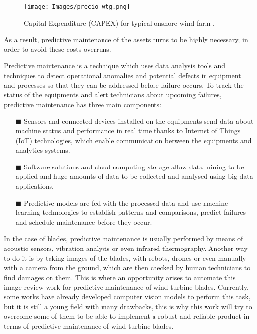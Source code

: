 \begin{figure*}[htbp]
        \centering            
        \texttt{[image: Images/precio\_wtg.png]}
        \caption[Capital Expenditure (CAPEX) for typical onshore wind farm \cite{costrev2020}.]
        {\small Capital Expenditure (CAPEX) for typical onshore wind farm \cite{costrev2020}.} 
        \label{fig:wtg_cost}
    \end{figure*}

As a result, predictive maintenance of the assets turns to be highly necessary, in order to avoid these costs overruns.

Predictive maintenance is a technique which uses data analysis tools and techniques to detect operational anomalies and potential defects in equipment and processes so that they can be addressed before failure occurs. To track the status of the equipments and alert technicians about upcoming failures, predictive maintenance has three main components:

\begin{itemize}[]
    \item[\tiny$\blacksquare$]\textbf{}Sensors and connected devices installed on the equipments send data about machine status and performance in real time thanks to Internet of Things (IoT) technologies, which enable communication between the equipments and analytics systems.
    \item[\tiny$\blacksquare$] \textbf{}Software solutions and cloud computing storage allow data mining to be applied and huge amounts of data to be collected and analysed using big data applications. 
    \item[\tiny$\blacksquare$] \textbf{}Predictive models are fed with the processed data and use machine learning technologies to establish patterns and comparisons, predict failures and schedule maintenance before they occur.
\end{itemize}

In the case of blades, predictive maintenance is usually performed by means of acoustic sensors, vibration analysis or even infrared thermography. Another way to do it is by taking images of the blades, with robots, drones or even manually with a camera from the ground, which are then checked by human technicians to find damages on them. This is where an opportunity arises to automate this image review work for predictive maintenance of wind turbine blades. Currently, some works have already developed computer vision models to perform this task, but it is still a young field with many drawbacks, this is why this work will try to overcome some of them to be able to implement a robust and reliable product in terms of predictive maintenance of wind turbine blades.


